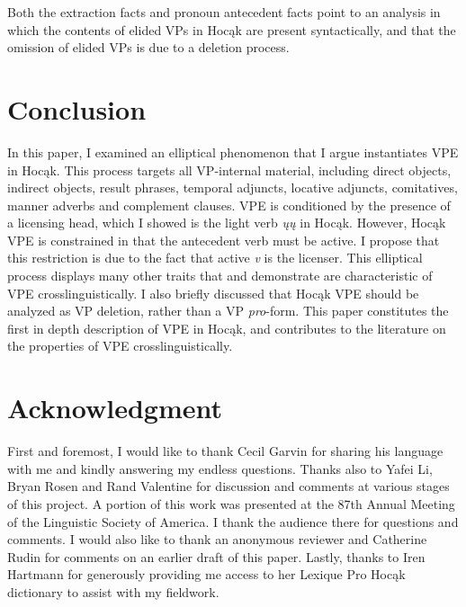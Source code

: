 \documentclass[output=paper]{LSP/langsci}
\begin{document}
\begin{exe}
\end{exe}


Both the extraction facts and pronoun antecedent facts point to an analysis in which the contents of elided VPs in Hocąk are present syntactically, and that the omission of elided VPs is due to a deletion process.

\section{Conclusion}

In this paper, I examined an elliptical phenomenon that I argue instantiates VPE in Hocąk. This process targets all VP-internal material, including direct objects, indirect objects, result phrases, temporal adjuncts, locative adjuncts, comitatives, manner adverbs and complement clauses. VPE is conditioned by the presence of a licensing head, which I showed is the light verb \emph{ųų} in Hocąk. However, Hocąk VPE is constrained in that the antecedent verb must be active. I propose that this restriction is due to the fact that active \emph{v} is the licenser. This elliptical process displays many other traits that \citet{Goldberg2005} and \citet{Fortin2007} demonstrate are characteristic of VPE crosslinguistically. I also briefly discussed that Hocąk VPE should be analyzed as VP deletion, rather than a VP \emph{pro}-form. This paper constitutes the first in depth description of VPE in Hocąk, and contributes to the literature on the properties of VPE crosslinguistically. 

\section*{Acknowledgment}

First and foremost, I would like to thank Cecil Garvin for sharing his language with me and kindly answering my endless questions. Thanks also to Yafei Li, Bryan Rosen and Rand Valentine for discussion and comments at various stages of this project. A portion of this work was presented at the 87th Annual Meeting of the Linguistic Society of America. I thank the audience there for questions and comments. I would also like to thank an anonymous reviewer and Catherine Rudin for comments on an earlier draft of this paper. Lastly, thanks to Iren Hartmann for generously providing me access to her Lexique Pro Hocąk dictionary to assist with my fieldwork.
\end{document}
